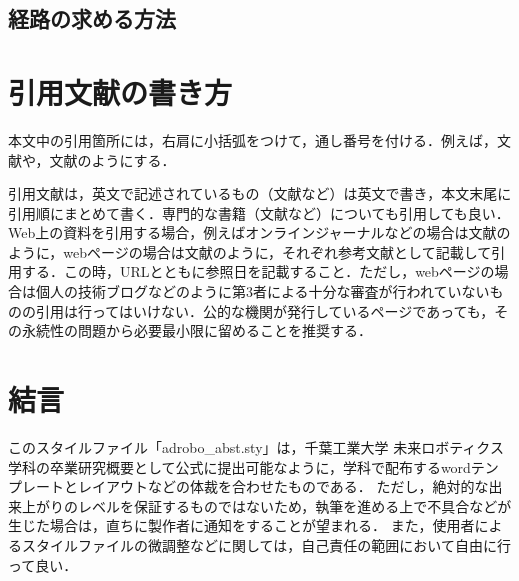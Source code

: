 \documentclass[10pt]{jarticle}
\begin{document}
	\subsection{経路の求める方法}

    
    \section{引用文献の書き方}%
    本文中の引用箇所には，右肩に小括弧をつけて，通し番号を付ける．例えば，文献\cite{工大2005}や，文献\cite{Shibutani2004, Handbook1979, Kikuchi2017, Adrobo2019}のようにする．
    
    引用文献は，英文で記述されているもの（文献\cite{Shibutani2004}など）は英文で書き，本文末尾に引用順にまとめて書く．専門的な書籍（文献\cite{Handbook1979}など）についても引用しても良い．
    Web上の資料を引用する場合，例えばオンラインジャーナルなどの場合は文献\cite{Kikuchi2017}のように，webページの場合は文献\cite{Adrobo2019}のように，それぞれ参考文献として記載して引用する．この時，URLとともに参照日を記載すること．ただし，webページの場合は個人の技術ブログなどのように第3者による十分な審査が行われていないものの引用は行ってはいけない．公的な機関が発行しているページであっても，その永続性の問題から必要最小限に留めることを推奨する．
        
    \section{結\hspace{2zw}言}%
    このスタイルファイル「adrobo\_abst.sty」は，千葉工業大学 未来ロボティクス学科の卒業研究概要として公式に提出可能なように，学科で配布するwordテンプレートとレイアウトなどの体裁を合わせたものである．
    ただし，絶対的な出来上がりのレベルを保証するものではないため，執筆を進める上で不具合などが生じた場合は，直ちに製作者に通知をすることが望まれる．
    また，使用者によるスタイルファイルの微調整などに関しては，自己責任の範囲において自由に行って良い．
    
\end{document}
